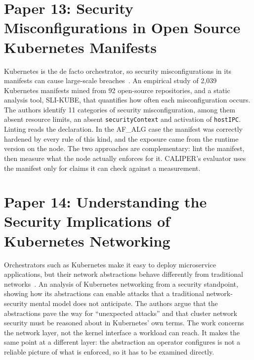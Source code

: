 \section{Paper 13: Security Misconfigurations in Open Source Kubernetes Manifests}
\label{lit:rahman}

 Kubernetes is the de facto orchestrator, so security misconfigurations in its manifests can cause large-scale breaches~\cite{rahman2023}.
 An empirical study of 2,039 Kubernetes manifests mined from 92 open-source repositories, and a static analysis tool, SLI-KUBE, that quantifies how often each misconfiguration occurs.
 The authors identify 11 categories of security misconfiguration, among them absent resource limits, an absent \texttt{securityContext} and activation of \texttt{hostIPC}.
 Linting reads the declaration. In the AF\_ALG case the manifest was correctly hardened by every rule of this kind, and the exposure came from the runtime version on the node.
 The two approaches are complementary: lint the manifest, then measure what the node actually enforces for it. CALIPER's evaluator uses the manifest only for claims it can check against a measurement.

\section{Paper 14: Understanding the Security Implications of Kubernetes Networking}
\label{lit:minna}

 Orchestrators such as Kubernetes make it easy to deploy microservice applications, but their network abstractions behave differently from traditional networks~\cite{minna2021}.
 An analysis of Kubernetes networking from a security standpoint, showing how its abstractions can enable attacks that a traditional network-security mental model does not anticipate.
 The authors argue that the abstractions pave the way for ``unexpected attacks'' and that cluster network security must be reasoned about in Kubernetes' own terms.
 The work concerns the network layer, not the kernel interface a workload can reach.
 It makes the same point at a different layer: the abstraction an operator configures is not a reliable picture of what is enforced, so it has to be examined directly.

